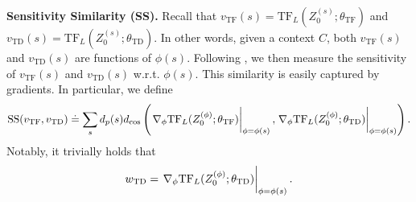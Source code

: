 \documentclass{article}
\newcommand{\fS}{\mathcal{S}}
\newcommand{\R}{\mathbb{R}}
\newcommand{\ns}{{|\fS|}}
\newcommand{\tb}[1]{{\textbf{#1}}}
\newcommand{\tf}{\text{TF}}
\newcommand{\td}{\text{TD}}
\begin{document}

\tb{Sensitivity Similarity (SS).} 
Recall that $v_{\tf}(s) = \tf_L(Z_0^{(s)}; \theta_\tf)$ and $v_{\td}(s) = \tf_L(Z_0^{(s)}; \theta_{\td})$. 
In other words, given a context $C$,
both $v_\tf(s)$ and $v_\td(s)$ are functions of $\phi(s)$.
Following \citet{vonoswald2023transformers},
we then measure the sensitivity of $v_\tf(s)$ and $v_\td(s)$ w.r.t. $\phi(s)$.
This similarity is easily captured by gradients.
In particular, 
we define
\begin{align}
    \text{SS}(v_\tf, v_\td) \doteq \sum_s d_p(s) d_\text{cos}\left(\eval{\nabla_{\phi} \tf_L(Z_0^{(\phi)}; \theta_\tf)}_{\phi = \phi(s)}, \eval{\nabla_{\phi} \tf_L(Z_0^{(\phi)}; \theta_\td)}_{\phi = \phi(s)}\right).
\end{align}
Notably,
it trivially holds that
\begin{align}
    w_\td = \eval{\nabla_{\phi} \tf_L(Z_0^{(\phi)}; \theta_\td)}_{\phi = \phi(s)}.
\end{align}
\end{document}
